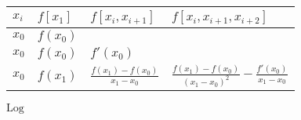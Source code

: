 \documentclass[12pt, a4paper, oneside]{ctexart}
\begin{document}
\begin{table}[!htbp] %
    \centering %
    \begin{tabular}{p{1cm}<{\centering}p{1cm}<{\centering}p{3cm}<{\centering}p{5cm}<{\centering}} %
        \toprule
        $x_i$ & $f[x_1]$ & $f[x_i,x_{i+1}]$ & $f[x_i,x_{i+1},x_{i+2}]$ \\
        \midrule
        $x_0$ & $f(x_0)$ &                  &                          \\
        $x_0$ & $f(x_0)$ & $f'(x_0)$        &                          \\
        $x_0$ & $f(x_1)$ & $\frac{f(x_1)-f(x_0)}{x_1-x_0}$ & $\frac{f(x_1)-f(x_0)}{(x_1-x_0)^2}-\frac{f'(x_0)}{x_1-x_0}$\\
        \bottomrule
    \end{tabular}
\end{table}

\def\Log{\text{Log}} %
$\Log$ %
\fi
\end{document}
